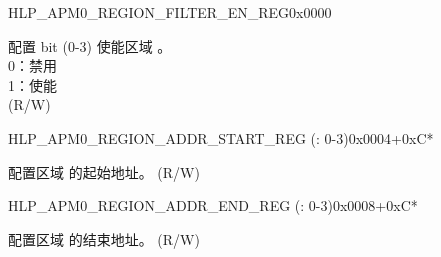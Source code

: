 \begin{register}{H}{LP\_APM0\_REGION\_FILTER\_EN\_REG}{0x0000}\label{regdesc:LPAPM0REGIONFILTERENREG}
%
%
\regnewline%
\begin{regdesc}\begin{reglist}
\label{fielddesc:LPAPM0REGIONFILTEREN}\item [LP\_APM0\_REGION\_FILTER\_EN] 配置 bit  (0-3) 使能区域 。\\
0：禁用 \\
1：使能  \\ (R/W)
\end{reglist}\end{regdesc}
\end{register}


\begin{register}{H}{LP\_APM0\_REGION\_ADDR\_START\_REG (: 0-3)}{0x0004+0xC*}\label{regdesc:LPAPM0REGION0ADDRSTARTREG}
%
\regnewline%
\begin{regdesc}\begin{reglist}
\label{fielddesc:LPAPM0REGION0ADDRSTART}\item [LP\_APM0\_REGION\regindex{n}\_ADDR\_START] 配置区域  的起始地址。 (R/W)
\end{reglist}\end{regdesc}
\end{register}

\begin{register}{H}{LP\_APM0\_REGION\_ADDR\_END\_REG (: 0-3)}{0x0008+0xC*}\label{regdesc:LPAPM0REGION0ADDRENDREG}
%
\regnewline%
\begin{regdesc}\begin{reglist}
\label{fielddesc:LPAPM0REGION0ADDREND}\item [LP\_APM0\_REGION\regindex{n}\_ADDR\_END] 配置区域  的结束地址。 (R/W)
\end{reglist}\end{regdesc}
\end{register}

















